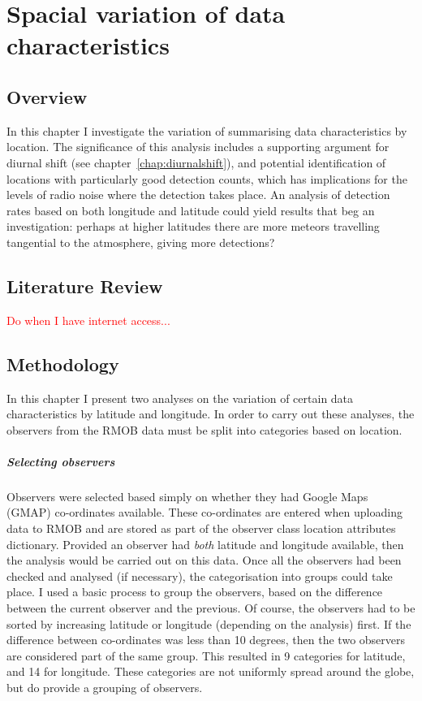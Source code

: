 \chapter{Spacial variation of data characteristics}
\label{chap:spacial}
\begin{abstract}
	
\end{abstract}
\section{Overview}
In this chapter I investigate the variation of summarising data characteristics by location. The significance of this analysis includes a supporting argument for diurnal shift (see chapter~\ref{chap:diurnalshift}), and potential identification of locations with particularly good detection counts, which has implications for the levels of radio noise where the detection takes place. An analysis of detection rates based on both longitude and latitude could yield results that beg an investigation: perhaps at higher latitudes there are more meteors travelling tangential to the atmosphere, giving more detections?
\section{Literature Review}
\textcolor{red}{Do when I have internet access...}
\section{Methodology}
In this chapter I present two analyses on the variation of certain data characteristics by latitude and longitude. In order to carry out these analyses, the observers from the RMOB data must be split into categories based on location.
\paragraph{Selecting observers\\}
Observers were selected based simply on whether they had Google Maps (GMAP) co-ordinates available. These co-ordinates are entered when uploading data to RMOB and are stored as part of the observer class location attributes dictionary. Provided an observer had {\it both} latitude and longitude available, then the analysis would be carried out on this data. Once all the observers had been checked and analysed (if necessary), the categorisation into groups could take place.
I used a basic process to group the observers, based on the difference between the current observer and the previous. Of course, the observers had to be sorted by increasing latitude or longitude (depending on the analysis) first. If the difference between co-ordinates was less than 10 degrees, then the two observers are considered part of the same group. This resulted in 9 categories for latitude, and 14 for longitude. These categories are not uniformly spread around the globe, but do provide a grouping of observers.
